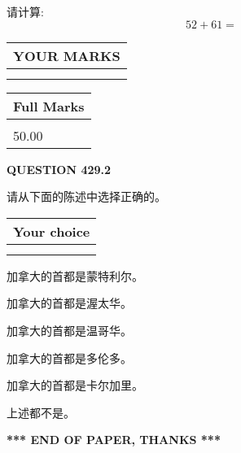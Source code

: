 \documentclass{ctexart}
\begin{document}
  
 
请计算:
\begin{equation}
52 +  %
61 = \nonumber
\end{equation}
 

 

 
  
\vspace{0.2in}
  
\noindent\begin{tabular}{|l|}
\hline
 YOUR MARKS  \\
\hline
 \\ 
 \\ 
\hline
\end{tabular}
\hspace{0.05in} \begin{tabular}{|l|}
\hline
 Full Marks  \\
\hline
 \\ 
50.00 \\
\hline
\end{tabular}
{\textbf{\Large{QUESTION
429.2 
}}}
  
  
请从下面的陈述中选择正确的。
  
  
\noindent\hspace{3.0in} \begin{tabular}{|l|}
\hline
Your choice \\
\hline
 \\ 
 \\ 
\hline
\end{tabular}
  
  
 
 
加拿大的首都是蒙特利尔。
 
 
加拿大的首都是渥太华。
 
 
加拿大的首都是温哥华。
 
 
加拿大的首都是多伦多。
 
 
加拿大的首都是卡尔加里。
 
 
 上述都不是。
 
 
   
   
 \vspace{0.2in}
 
   
   
   
   
\vspace{1.0in} 
{\textbf{\large{ *** END OF PAPER, THANKS *** }}} 
   
\end{document}
